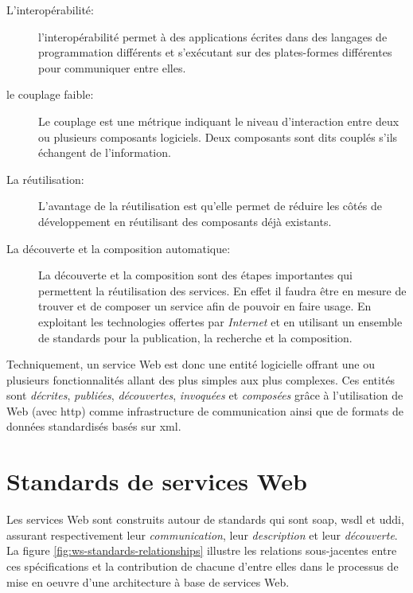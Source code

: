   \renewcommand{\descriptionlabel}[1]{\hspace{0.5cm}\textbullet~\textsf{#1}}
  \begin{description}
  \item [L'interopérabilité:] l'interopérabilité permet à des
    applications écrites dans des langages de programmation différents
    et s'exécutant sur des plates-formes différentes pour communiquer
    entre elles.

  \item [le couplage faible:] Le couplage est une métrique indiquant
    le niveau d'interaction entre deux ou plusieurs composants
    logiciels. Deux composants sont dits couplés s'ils échangent de
    l'information.

  \item [La réutilisation:] L'avantage de la réutilisation est qu'elle
    permet de réduire les côtés de développement en réutilisant
    des composants déjà existants.

  \item [La découverte et la composition automatique:] La découverte
    et la composition sont des étapes importantes qui permettent la
    réutilisation des services. En effet il faudra être en mesure de
    trouver et de composer un service afin de pouvoir en faire
    usage. En exploitant les technologies offertes par
    \textit{Internet} et en utilisant un ensemble de standards pour la
    publication, la recherche et la composition.
  \end{description}
  \enddescription

  Techniquement, un service Web est donc une entité logicielle offrant
  une ou plusieurs fonctionnalités allant des plus simples aux plus
  complexes. Ces entités sont \emph{décrites}, \emph{publiées},
  \emph{découvertes}, \emph{invoquées} et \emph{composées} grâce à
  l'utilisation de Web (avec \acrshort{http}) comme infrastructure de
  communication ainsi que de formats de données standardisés basés sur
  \acrshort{xml}.

\section{Standards de services Web}
\label{sec:ws-standards}
Les services Web sont construits autour de standards qui sont
\acrshort{soap}, \acrshort{wsdl} et \acrshort{uddi}, assurant
respectivement leur \emph{communication}, leur \emph{description} et
leur \emph{découverte}. La figure \ref{fig:ws-standards-relationships}
illustre les relations sous-jacentes entre ces spécifications et la
contribution de chacune d'entre elles dans le processus de mise en oeuvre
d'une architecture à base de services Web.\bigskip


